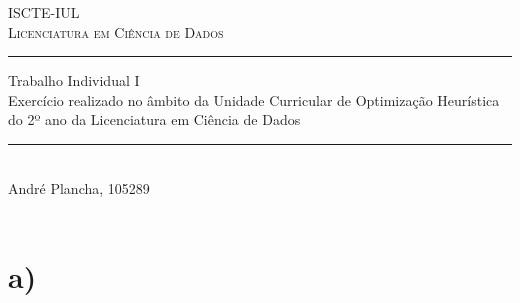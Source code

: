 \begin{titlepage}
  \normalfont\centering

  \normalsize
  \textsc{ISCTE-IUL}\\[-2pt]
  \textsc{Licenciatura em Ciência de Dados}\\
  \vspace{0.5cm}

  \Huge
  \rule[0.3cm]{\linewidth}{0.5pt}
  Trabalho Individual I \\
  \vspace{0.5cm}
  \large
  Exercício realizado no âmbito da Unidade Curricular de Optimização Heurística do 2º ano da Licenciatura em Ciência de Dados
  \rule[-0.5cm]{\linewidth}{1pt}\\

  \vspace{1.2cm}
  {\LARGE 
    André Plancha, 105289 \\
     \\
  }
  \normalsize
  \vspace{3cm}
  {
    \let\clearpage\relax
    \tableofcontents
  }


\end{titlepage}
\section{a)}
\blindtext

